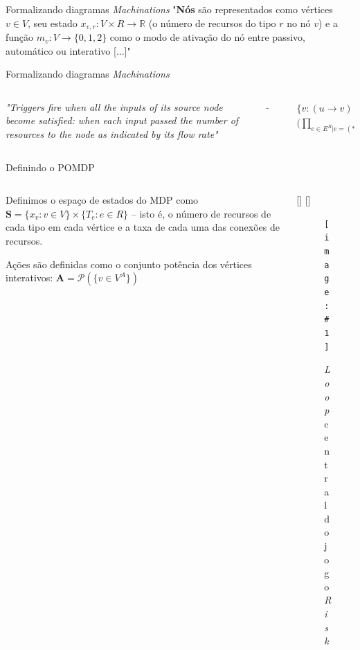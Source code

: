 \documentclass[aspectratio=169]{beamer}
\newcommand{\insertfigure}[3]{
  \StrBehind{#1}{/}[\FileWithExt]
  \StrBefore{\FileWithExt}{.}[\FileName]
  \begin{figure}[h!]
    \vspace{0.25cm}
    \centering
    \texttt{[image: \#1]}
    \caption{#2}
    \label{fig:\FileName}
  \end{figure}
}
\newcommand{\St}{\mathbf{S}}
\newcommand{\A}{\mathbf{A}}
\begin{document}
\begin{frame}{Formalizando diagramas \textit{Machinations}}
    "\textbf{Nós} são representados como vértices $v \in V$, seu estado $x_{v,r}: V \times R \rightarrow \mathbb{R}$ (o número de recursos do tipo $r$ no nó $v$) e a função $m_{v}: V \rightarrow \{0,1,2\}$ como o modo de ativação do nó entre passivo, automático ou interativo [...]"
\end{frame}

\begin{frame}{Formalizando diagramas \textit{Machinations}}

    \begin{columns}
        \begin{column}{0.4\textwidth}
            \vspace{0.75cm}

            \textit{"Triggers fire when all the inputs of its source node become satisfied: when each input passed the number of resources to the node as indicated by its flow rate"}
        \end{column}
        \begin{column}{0.1\textwidth}
            \begin{center}
                $\rightarrow$
            \end{center}
        \end{column}
        \begin{column}{0.4\textwidth}
            \vspace{0.75cm}
            \begin{align*}
                &\{v: (u \rightarrow v) \in E^G\ | \\\ &\Big(\prod_{e \in E^R | e = (* \rightarrow u)}{\Delta e(t-1) = T_e \Big)} = 1 \}\\
            \end{align*}
        \end{column}
    \end{columns}
\end{frame}

\begin{frame}{Definindo o POMDP}
    \begin{columns}
	\begin{column}{0.5\textwidth}
	    Definimos o espaço de estados do MDP como $\St = \{x_v: v \in V\} \times \{T_e: e \in R \}$ -- isto é, o número de recursos de cada tipo em cada vértice e a taxa de cada uma das conexões de recursos.

	    \vspace{0.25cm}

	    Ações são definidas como o conjunto potência dos vértices interativos: $\A = \mathcal{P}(\{ v \in V^A \})$
	\end{column}
	\begin{column}{0.5\textwidth}
	    \insertfigure
		{figures/risk.png}
        {\textit{Loop} central do jogo \textit{Risk} \parencite{machinations}}
		{1.0}
	\end{column}
    \end{columns}
\end{frame}
\end{document}
